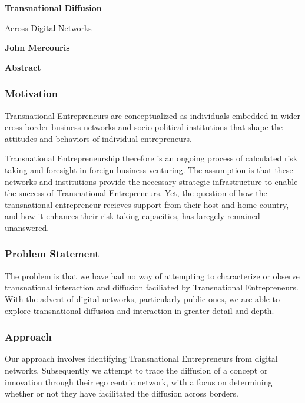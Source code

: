 \thispagestyle{plain}
\begin{center}
    \Large
    \textbf{Transnational Diffusion}
    
    \vspace{0.4cm}
    \large
    Across Digital Networks
    
    \vspace{0.4cm}
    \textbf{John Mercouris}
    
    \vspace{0.9cm}
    \textbf{Abstract}
\end{center}

\subsubsection{Motivation}
Transnational Entrepreneurs are conceptualized as individuals embedded
in wider cross-border business networks and socio-political
institutions that shape the attitudes and behaviors of individual
entrepreneurs.

Transnational Entrepreneurship therefore is an ongoing process of
calculated risk taking and foresight in foreign business
venturing. The assumption is that these networks and institutions
provide the necessary strategic infrastructure to enable the success
of Transnational Entrepreneurs. Yet, the question of how the
transnational entrepreneur recieves support from their host and home
country, and how it enhances their risk taking capacities, has
laregely remained unanswered.

\subsubsection{Problem Statement}
The problem is that we have had no way of attempting to characterize
or observe transnational interaction and diffusion faciliated by
Transnational Entrepreneurs. With the advent of digital networks,
particularly public ones, we are able to explore transnational
diffusion and interaction in greater detail and depth.

\subsubsection{Approach}
Our approach involves identifying Transnational Entrepreneurs from
digital networks. Subsequently we attempt to trace the diffusion of a
concept or innovation through their ego centric network, with a focus
on determining whether or not they have facilitated the diffusion
across borders.

